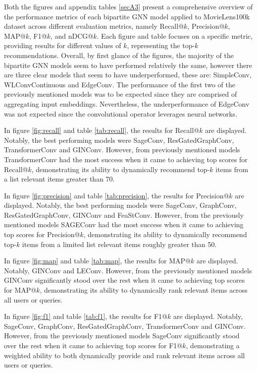\documentclass{scrartcl}
\begin{document}
\quad Both the figures and appendix tables \ref{secA3} present a comprehensive overview of the performance metrics of each bipartite GNN model applied to MovieLens100k dataset across different evaluation metrics, namely Recall@$k$, Precision@$k$, MAP@$k$, F1@$k$, and nDCG@$k$. Each figure and table focuses on a specific metric, providing results for different values of $k$, representing the top-$k$ recommendations. Overall, by first glance of the figures, the majority of the bipartite GNN models seem to have performed relatively the same, however there are three clear models that seem to have underperformed, these are: SimpleConv, WLConvContinuous and EdgeConv. The performance of the first two of the previously mentioned models was to be expected since they are comprised of aggregating input embeddings. Nevertheless, the underperformance of EdgeConv was not expected since the convolutional operator leverages neural networks.

In figure \ref{fig:recall} and table \ref{tab:recall}, the results for Recall@$k$ are displayed. Notably, the best performing models were SageConv, ResGatedGraphConv, TransformerConv and GINConv. However, from previously mentioned models TransformerConv had the most success when it came to achieving top scores for Recall@$k$, demonstrating its ability to dynamically recommend top-$k$ items from a list relevant items greater than 70.

In figure \ref{fig:precision} and table \ref{tab:precision}, the results for Precision@$k$ are displayed. Notably, the best performing models were SageConv, GraphConv, ResGatedGraphConv, GINConv and FeaStConv. However, from the previously mentioned models SAGEConv had the most success when it came to achieving top scores for Precision@$k$, demonstrating its ability to dynamically recommend top-$k$ items from a limited list relevant items roughly greater than 50.

In figure \ref{fig:map} and table \ref{tab:map}, the results for MAP@$k$ are displayed. Notably, GINConv and LEConv. However, from the previously mentioned models GINConv significantly stood over the rest when it came to achieving top scores for MAP@$k$, demonstrating its ability to dynamically rank relevant items across all users or queries.

In figure \ref{fig:f1} and table \ref{tab:f1}, the results for F1@$k$ are displayed. Notably, SageConv, GraphConv, ResGatedGraphConv, TransformerConv and GINConv. However, from the previously mentioned models SageConv significantly stood over the rest when it came to achieving top scores for F1@$k$, demonstrating a weighted ability to both dynamically provide and rank relevant items across all users or queries.
\end{document}
